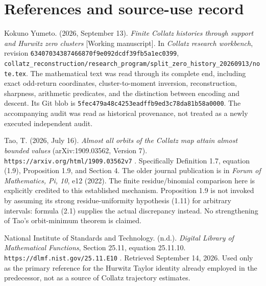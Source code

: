 \section{References and source-use record}

Kokuno Yumeto. (2026, September 13). \emph{Finite Collatz histories
through support and Hurwitz zero clusters} {[}Working manuscript{]}. In
\emph{Collatz research workbench}, revision
\nolinkurl{63407034387466870f9e092dcdf39fb5a1ec0399},
\nolinkurl{collatz_reconstruction/research_program/split_zero_history_20260913/note.tex}.
The mathematical text was read through its complete end, including exact
odd-return coordinates, cluster-to-moment inversion, reconstruction,
sharpness, arithmetic predicates, and the distinction between encoding
and descent. Its Git blob is
\nolinkurl{5fec479a48c4253eadffb9ed3c78da81b58a0000}. The accompanying
audit was read as historical provenance, not treated as a newly executed
independent audit.

Tao, T. (2026, July 16). \emph{Almost all orbits of the Collatz map
attain almost bounded values} (arXiv:1909.03562, Version 7).
\nolinkurl{https://arxiv.org/html/1909.03562v7} . Specifically
Definition 1.7, equation (1.9), Proposition 1.9, and Section 4. The
older journal publication is in \emph{Forum of Mathematics, Pi, 10}, e12
(2022). The finite residue/binomial comparison here is explicitly
credited to this established mechanism. Proposition 1.9 is not invoked
by assuming its strong residue-uniformity hypothesis (1.11) for
arbitrary intervals: formula (2.1) supplies the actual discrepancy
instead. No strengthening of Tao's orbit-minimum theorem is claimed.

National Institute of Standards and Technology. (n.d.). \emph{Digital
Library of Mathematical Functions}, Section 25.11, equation 25.11.10.
\nolinkurl{https://dlmf.nist.gov/25.11.E10} . Retrieved September 14,
2026. Used only as the primary reference for the Hurwitz Taylor identity
already employed in the predecessor, not as a source of Collatz
trajectory estimates.
